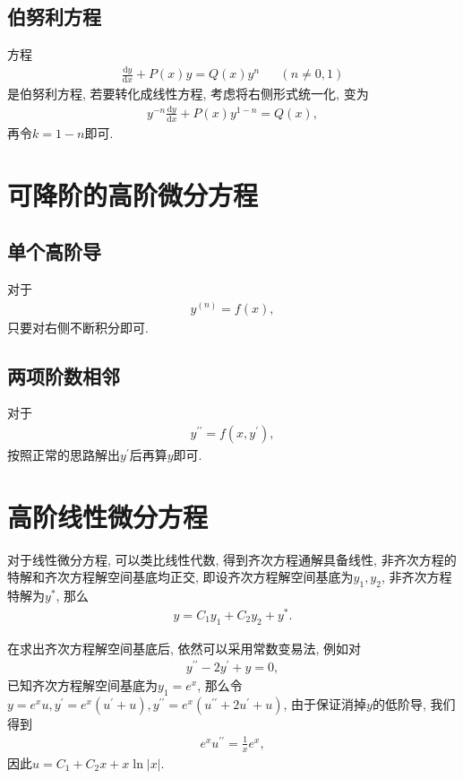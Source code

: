 \documentclass[UTF8,a4paper,11pt]{ctexart}
\begin{document}
    \subsection{伯努利方程}
      方程
      \[
      \begin{aligned}
        \frac{\mathrm{d}y}{\mathrm{d}x}+P\left(x\right)y=Q\left(x\right)y^{n} && \left(n\neq 0, 1\right)
      \end{aligned}
      \]
      是伯努利方程,
      若要转化成线性方程,
      考虑将右侧形式统一化, 变为
      \[
      \begin{aligned}
        y^{-n}\frac{\mathrm{d}y}{\mathrm{d}x}+P\left(x\right)y^{1-n}=Q\left(x\right),
      \end{aligned}
      \]
      再令$k=1-n$即可.

  \section{可降阶的高阶微分方程}
    \subsection{单个高阶导}
      对于
      \[
      \begin{aligned}
        y^{(n)}=f\left(x\right),
      \end{aligned}
      \]
      只要对右侧不断积分即可.

    \subsection{两项阶数相邻}
      对于
      \[
      \begin{aligned}
        y^{\prime\prime}=f\left(x, y^{\prime}\right),
      \end{aligned}
      \]
      按照正常的思路解出$y^{\prime}$后再算$y$即可.

  \section{高阶线性微分方程}
    对于线性微分方程, 可以类比线性代数, 
    得到齐次方程通解具备线性, 非齐次方程的特解和齐次方程解空间基底均正交,
    即设齐次方程解空间基底为$y_1, y_2$, 非齐次方程特解为$y^{*}$,
    那么
    \[
    \begin{aligned}
      y=C_1y_1+C_2y_2+y^{*}.
    \end{aligned}
    \]
    
    在求出齐次方程解空间基底后, 依然可以采用常数变易法,
    例如对
    \[
    \begin{aligned}
      y^{\prime\prime}-2y^{\prime}+y=0,
    \end{aligned}
    \]
    已知齐次方程解空间基底为$y_1=e^{x}$,
    那么令$y=e^{x}u, y^{\prime}=e^{x}\left(u^{\prime}+u\right), y^{\prime\prime}=e^{x}\left(u^{\prime\prime}+2u^{\prime}+u\right)$,
    由于保证消掉$y$的低阶导, 我们得到
    \[
    \begin{aligned}
      e^{x}u^{\prime\prime}=\frac{1}{x}e^{x},
    \end{aligned}
    \]
    因此$u=C_1+C_2x+x \ln \left| x \right|$.
\end{document}
